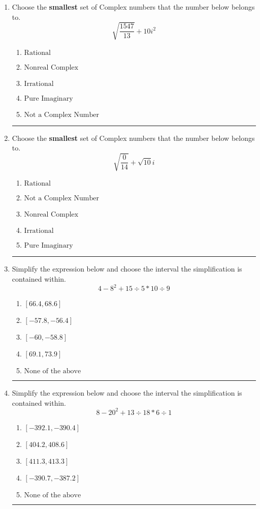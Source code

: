 \documentclass[14pt]{extbook}
\newcommand{\litem}[1]{\item#1\hspace*{-1cm}\rule{\textwidth}{0.4pt}}
\begin{document}
\begin{enumerate}
\litem{
Choose the \textbf{smallest} set of Complex numbers that the number below belongs to.\[ \sqrt{\frac{1547}{13}}+10i^2 \]\begin{enumerate}[label=\Alph*.]
\item \( \text{Rational} \)
\item \( \text{Nonreal Complex} \)
\item \( \text{Irrational} \)
\item \( \text{Pure Imaginary} \)
\item \( \text{Not a Complex Number} \)

\end{enumerate} }
\litem{
Choose the \textbf{smallest} set of Complex numbers that the number below belongs to.\[ \sqrt{\frac{0}{14}}+\sqrt{10}i \]\begin{enumerate}[label=\Alph*.]
\item \( \text{Rational} \)
\item \( \text{Not a Complex Number} \)
\item \( \text{Nonreal Complex} \)
\item \( \text{Irrational} \)
\item \( \text{Pure Imaginary} \)

\end{enumerate} }
\litem{
Simplify the expression below and choose the interval the simplification is contained within.\[ 4 - 8^2 + 15 \div 5 * 10 \div 9 \]\begin{enumerate}[label=\Alph*.]
\item \( [66.4, 68.6] \)
\item \( [-57.8, -56.4] \)
\item \( [-60, -58.8] \)
\item \( [69.1, 73.9] \)
\item \( \text{None of the above} \)

\end{enumerate} }
\litem{
Simplify the expression below and choose the interval the simplification is contained within.\[ 8 - 20^2 + 13 \div 18 * 6 \div 1 \]\begin{enumerate}[label=\Alph*.]
\item \( [-392.1, -390.4] \)
\item \( [404.2, 408.6] \)
\item \( [411.3, 413.3] \)
\item \( [-390.7, -387.2] \)
\item \( \text{None of the above} \)


\end{enumerate}}
\end{enumerate}
\end{document}
